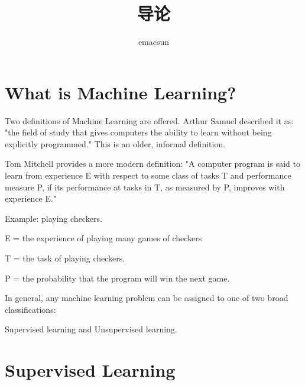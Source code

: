 \documentclass[10pt,a4paper,UTF8]{article}
\author{emacsun}
\date{}
\title{导论}
\begin{document}
\maketitle
\tableofcontents
{}
\section{What is Machine Learning?}
\label{sec:org30457a9}

Two definitions of Machine Learning are offered. Arthur Samuel described it as: "the field of study that gives computers the ability to learn without being explicitly programmed." This is an older, informal definition.

Tom Mitchell provides a more modern definition: "A computer program is said to learn from experience E with respect to some class of tasks T and performance measure P, if its performance at tasks in T, as measured by P, improves with experience E."

Example: playing checkers.

E = the experience of playing many games of checkers

T = the task of playing checkers.

P = the probability that the program will win the next game.

In general, any machine learning problem can be assigned to one of two broad classifications:

Supervised learning and Unsupervised learning.

\section{Supervised Learning}
\label{sec:org6b73de5}
\end{document}
